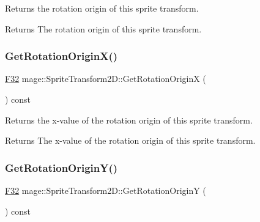 Returns the rotation origin of this sprite transform.

\begin{DoxyReturn}{Returns}
The rotation origin of this sprite transform. 
\end{DoxyReturn}
\mbox{\label{classmage_1_1_sprite_transform2_d_a053c009f7f81df2e307fc6b5eb79a3b6}} 
\subsubsection{\texorpdfstring{Get\+Rotation\+Origin\+X()}{GetRotationOriginX()}}
{\footnotesize\ttfamily \mbox{\hyperlink{namespacemage_aa97e833b45f06d60a0a9c4fc22ae02c0}{F32}} mage\+::\+Sprite\+Transform2\+D\+::\+Get\+Rotation\+OriginX (\begin{DoxyParamCaption}{ }\end{DoxyParamCaption}) const\hspace{0.3cm}{\ttfamily [noexcept]}}

Returns the x-\/value of the rotation origin of this sprite transform.

\begin{DoxyReturn}{Returns}
The x-\/value of the rotation origin of this sprite transform. 
\end{DoxyReturn}
\mbox{\label{classmage_1_1_sprite_transform2_d_a221b1dbbe09bf618ba5e3d396560820a}} 
\subsubsection{\texorpdfstring{Get\+Rotation\+Origin\+Y()}{GetRotationOriginY()}}
{\footnotesize\ttfamily \mbox{\hyperlink{namespacemage_aa97e833b45f06d60a0a9c4fc22ae02c0}{F32}} mage\+::\+Sprite\+Transform2\+D\+::\+Get\+Rotation\+OriginY (\begin{DoxyParamCaption}{ }\end{DoxyParamCaption}) const\hspace{0.3cm}{\ttfamily [noexcept]}}


